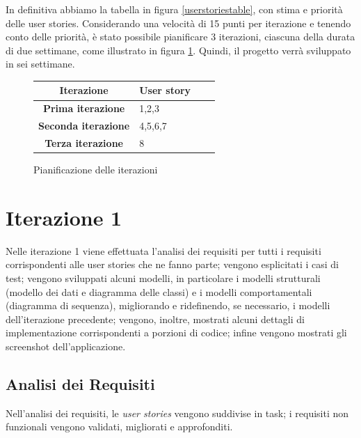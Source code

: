 In definitiva abbiamo la tabella in figura \ref{userstoriestable}, con stima e priorità delle user stories.
Considerando una velocità di 15 punti per iterazione e tenendo conto delle priorità, è stato possibile pianificare 3 iterazioni, ciascuna della durata di due settimane, come illustrato in figura \ref{pianificazioneiterazioni}.
Quindi, il progetto verrà sviluppato in sei settimane.
\begin{figure}[h!]
\begin{center}

\begin{tabular}[c]{|c|p{7cm}|c|c|}
\hline
Iterazione & User story\\ \hline
\textbf{Prima iterazione} & 1,2,3 \\ \hline
\textbf{Seconda iterazione} & 4,5,6,7\\ \hline
\textbf{Terza iterazione} & 8\\ \hline
\end{tabular}
\caption{Pianificazione delle iterazioni\label{pianificazioneiterazioni}}

\end{center}
\end{figure}

\clearpage

\section{Iterazione 1}
Nelle iterazione 1 viene effettuata l'analisi dei requisiti per tutti i requisiti corrispondenti alle user stories che ne fanno parte; vengono esplicitati i casi di test; vengono sviluppati alcuni modelli, in particolare i modelli strutturali (modello dei dati e diagramma delle classi) e i modelli comportamentali (diagramma di sequenza), migliorando e ridefinendo, se necessario, i modelli dell'iterazione precedente; vengono, inoltre, mostrati alcuni dettagli di implementazione corrispondenti a porzioni di codice; infine vengono mostrati gli screenshot dell'applicazione.\\

\subsection{Analisi dei Requisiti}
Nell'analisi dei requisiti, le \textit{user stories} vengono suddivise in task; i requisiti non funzionali vengono validati, migliorati e approfonditi.

